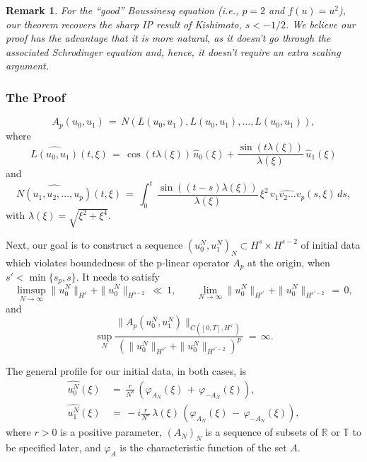 \documentclass{beamer}
\numberwithin{equation}{section}
\newtheorem{remark}{Remark}
\begin{document}
\begin{frame}
\begin{remark}
For the ``good'' Boussinesq equation (i.e., $p=2$ and $f(u)=u^2$), our theorem recovers the sharp IP result of Kishimoto, $s<-1/2$. We believe our proof has the advantage that it is more natural, as it doesn't go through  the associated Schrodinger equation and, hence, it doesn't require an extra scaling argument.  
\end{remark}
\end{frame}
\begin{frame}
  \frametitle{The Proof}
\begin{equation*}
A_p(u_0,u_1)\,=\,N(L(u_0,u_1),L(u_0,u_1), \ldots, L(u_0,u_1)),
\label{Ap}
\end{equation*}
\pause
where
\begin{equation*}
\widehat{L(u_0,u_1)}(t,\xi)\,=\,\cos(t \lambda(\xi))\, \widehat{u}_0(\xi)+\frac{\sin(t \lambda(\xi))}{\lambda(\xi)} \,\widehat{u}_1(\xi)
\label{L}
\end{equation*}
\pause
and
\begin{equation*}
\widehat{N(u_{1},u_{2}, \ldots, u_{p})}(t,\xi)\,=\,\int_0^t\,\frac{\sin((t-s) \lambda(\xi))}{\lambda(\xi)}\, \xi^2\, \widehat{v_{1}  v_{2}  \ldots v_{p}}(s,\xi)\,ds,
\label{N}
\end{equation*}
with $\lambda(\xi)=\sqrt{\xi^2+\xi^4}$. 
\end{frame}
\begin{frame}
Next, our goal is to construct a sequence $\left(u^N_0,u^N_1\right)_N\subset H^s\times H^{s-2}$ of initial data which violates boundedness of the p-linear operator $A_p$ at the origin, when $s'< \min\{s_p, s\}$. It needs to satisfy
\pause
\begin{equation*}
\limsup_{N\to \infty} \|u_0^N\|_{H^s} + \|u_0^N\|_ {H^{s-2}}\,\ll\,1, \qquad
\lim_{N\to \infty} \|u_0^N\|_{H^{s'}} + \|u_0^N\|_ {H^{{s'}-2}}\,=\,0,
\label{ivhs}
\end{equation*}
\pause
and 
\begin{equation*}
\sup_N \frac{\|A_{p}(u_0^N,u_1^N)\|_{C([0,T],H^{s'})}}{(\|u_0^N\|_{H^{s'}} + \|u_0^N\|_ {H^{{s'}-2}})^{p}}\,=\,\infty.
\label{ratio}
\end{equation*}
\end{frame}
\begin{frame}
The general profile for our initial data, in both cases, is
\begin{align*}
\widehat{u^N_0}(\xi)\,&=\,\frac{r}{N^{s}}\,\left(\varphi_{A_N}(\xi)\,+\,\varphi_{-A_N}(\xi)\right), \\
\widehat{u^N_1}(\xi)\,&=\,-i \frac{r}{N^{s}}\,\lambda(\xi)\,\left(\varphi_{A_N}(\xi)\,-\,\varphi_{-A_N}(\xi)\right),\label{u1n}
\end{align*}
where $r>0$ is a positive parameter, $(A_N)_N$ is a sequence of subsets of $\mathbb{R}$ or $\mathbb{T}$ to be specified later, and $\varphi_A$ is the characteristic function of the set $A$. 
\end{frame}
\end{document}
